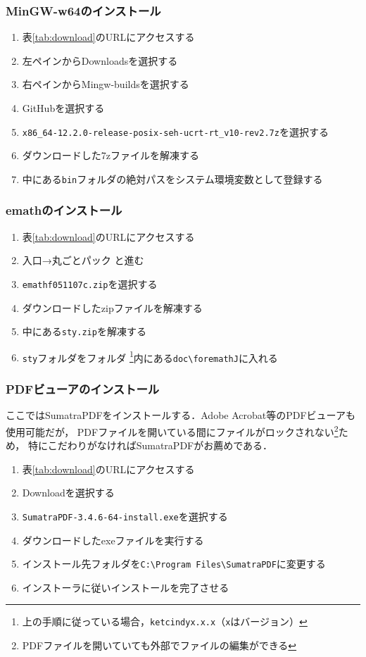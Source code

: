 \subsubsection{MinGW-w64のインストール}
\begin{enumerate}
    \item 表\ref{tab:download}のURLにアクセスする
    \item 左ペインからDownloadsを選択する
    \item 右ペインからMingw-buildsを選択する
    \item GitHubを選択する
    \item \verb|x86_64-12.2.0-release-posix-seh-ucrt-rt_v10-rev2.7z|を選択する
    \item ダウンロードした7zファイルを解凍する
    \item 中にある\verb|bin|フォルダの絶対パスをシステム環境変数として登録する
\end{enumerate}

\subsubsection{emathのインストール}
\begin{enumerate}
    \item 表\ref{tab:download}のURLにアクセスする
    \item 入口→丸ごとパック と進む
    \item \verb|emathf051107c.zip|を選択する
    \item ダウンロードしたzipファイルを解凍する
    \item 中にある\verb|sty.zip|を解凍する
    \item \verb|sty|フォルダを{\ketcindy}フォルダ
          \cprotect\footnote{上の手順に従っている場合，\verb|ketcindyx.x.x|（\verb|x|はバージョン）}内にある\verb|doc\foremathJ|に入れる
\end{enumerate}

\subsubsection{PDFビューアのインストール}
ここではSumatraPDFをインストールする．Adobe Acrobat等のPDFビューアも使用可能だが，
PDFファイルを開いている間にファイルがロックされない\footnote{PDFファイルを開いていても外部でファイルの編集ができる}ため，
特にこだわりがなければSumatraPDFがお薦めである．
\begin{enumerate}
    \item 表\ref{tab:download}のURLにアクセスする
    \item Downloadを選択する
    \item \verb|SumatraPDF-3.4.6-64-install.exe|を選択する
    \item ダウンロードしたexeファイルを実行する
    \item インストール先フォルダを\verb|C:\Program Files\SumatraPDF|に変更する
    \item インストーラに従いインストールを完了させる
\end{enumerate}

